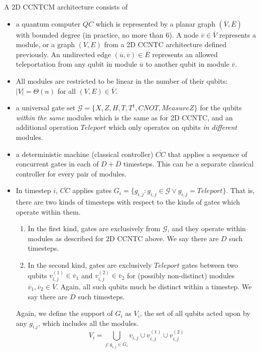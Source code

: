 \begin{definition}
A \textsf{2D CCNTCM} architecture consists of

\begin{itemize}
\item a quantum computer $\overline{QC}$ which is represented by a planar graph $(\overline{V},\overline{E})$ with bounded degree
(in practice, no more than 6).
A node $\overline{v} \in \overline{V}$ represents a module,
or a graph $(V,E)$
from a \textsf{2D CCNTC} architecture defined previously.
An
undirected edge $(\overline{u},\overline{v}) \in \overline{E}$ represents an
allowed teleportation from any qubit in module $\overline{u}$ to
another qubit in module $\overline{v}$.
\item All modules are restricted to be linear in the number of their qubits:
$|V| = \Theta(n)$ for all $(V,E) \in \overline{V}$.
\item a universal gate set $\mathcal{G} = \{X, Z, H, T, T^{\dagger}, CNOT,
MeasureZ\}$
for the qubits \emph{within the same} modules which is the same as for \textsf{2D CCNTC},
and an additional operation $Teleport$ which only operates on qubits
\emph{in
different} modules.
\item a deterministic machine (classical controller) $\overline{CC}$ that applies a sequence
of concurrent gates in each of $D+\overline{D}$ timesteps.
This can be a separate classical controller
for every pair of modules.
\item In timestep $i$, $\overline{CC}$ applies
gates $G_i = \{g_{i,j} : g_{i,j} \in \mathcal{G} \lor g_{i,j} = Teleport \}$.
That is, there are two kinds of timesteps with respect to the kinds of gates
which operate within them.
\begin{enumerate}
\item In the first kind, gates are exclusively from $\mathcal{G}$, and
they operate within modules as described
for \textsf{2D CCNTC} above. We say there are $D$ such timesteps.
\item In the second kind, gates are exclusively $Teleport$ gates between two qubits $v^{(1)}_{i,j} \in \overline{v}_1$ and
$v^{(2)}_{i,j} \in \overline{v}_2$ for
(possibly non-distinct) modules $\overline{v}_1, \overline{v}_2 \in \overline{V}$.
Again, all such qubits much be distinct within a timestep.
We say there are $\overline{D}$ such timesteps.
\end{enumerate}

Again, we define the support of $G_i$
as $V_i$, the set of all qubits acted upon by any $g_{i.j}$, which
includes all the modules.
\begin{equation}
V_i = \bigcup_{j: g_{i,j} \in G_i} v_{i,j} \cup v^{(1)}_{i,j} \cup v^{(2)}_{i,j} 
\end{equation}

\end{itemize}
\end{definition}

